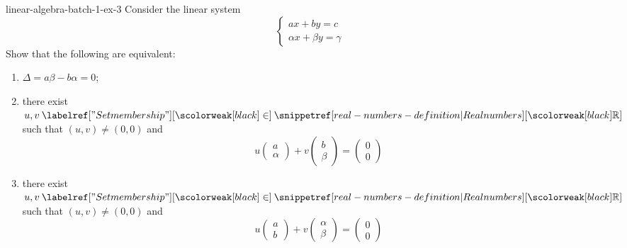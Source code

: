 \documentclass[preview]{standalone}
\begin{document}
\begin{snippetexercise}{linear-algebra-batch-1-ex-3}{}
    Consider the linear system
    \[
        \begin{cases}
            a x + by = c \\
            \alpha x + \beta y = \gamma
        \end{cases}
    \]
    Show that the following are equivalent:
    \begin{enumerate}
        \item \(\Delta = a\beta - b\alpha = 0\);
        \item there exist \(u,v \in \realnumbers\) such that \((u,v) \neq (0,0)\) and
        \[
            u\begin{pmatrix}
                a \\ \alpha
            \end{pmatrix}
            +
            v\begin{pmatrix}
                b \\ \beta
            \end{pmatrix}
            = \begin{pmatrix}
                0 \\ 0
            \end{pmatrix}
        \]
        \item there exist \(u,v \in \realnumbers\) such that \((u,v) \neq (0,0)\) and
        \[
            u\begin{pmatrix}
                a \\ b
            \end{pmatrix}
            +
            v\begin{pmatrix}
                \alpha \\ \beta
            \end{pmatrix}
            = \begin{pmatrix}
                0 \\ 0
            \end{pmatrix}
        \]
    \end{enumerate}
\end{snippetexercise}
\end{document}
